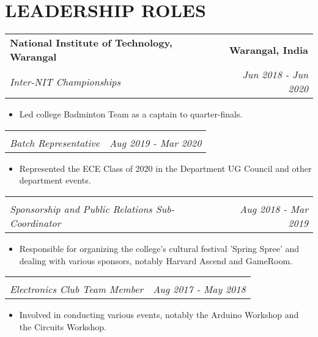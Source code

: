 \documentclass[letterpaper,11pt]{article}
\makeatletter
\newcommand{\resumeItem}[1]{
  \item\small{
    {#1 \vspace{-2pt}}
  }
}
\newcommand{\resumeSubheading}[4]{
  \vspace{-2pt}\item
    \begin{tabular*}{1.0\textwidth}[t]{l@{\extracolsep{\fill}}r}
      \textbf{#1} & \textbf{\small #2} \\
      \textit{\small#3} & \textit{\small #4} \\
    \end{tabular*}\vspace{-7pt}
}
\newcommand{\resumeItemListStart}{\begin{itemize}}
\newcommand{\resumeItemListEnd}{\end{itemize}\vspace{-5pt}}
\makeatother
\begin{document}
  
\section{LEADERSHIP ROLES}
 \resumeSubheading 
      {National Institute of Technology, Warangal}{Warangal, India}      
      {Inter-NIT Championships}{Jun 2018 - Jun 2020}
      \resumeItemListStart     
        	\resumeItem{Led college Badminton Team as a captain to quarter-finals.}
      \resumeItemListEnd  
      
 \vspace{-15pt}
 \resumeSubheading 
      {}{}      
      {Batch Representative}{Aug 2019 - Mar 2020}
      \resumeItemListStart      
        	\resumeItem{Represented the ECE Class of 2020 in the Department UG 												Council and other department events.}
        	\resumeItemListEnd
            
   \vspace{-15pt}
  \resumeSubheading 
      {}{}      
      {Sponsorship and Public Relations Sub-Coordinator}{Aug 2018 - Mar 2019}
      \resumeItemListStart      
            \resumeItem{Responsible for organizing the college's cultural festival 'Spring                                     Spree' and dealing with various sponsors, notably Harvard                                              Ascend and GameRoom.}
            \resumeItemListEnd
            
 \vspace{-15pt}
 \resumeSubheading 
      {}{}      
      {Electronics Club Team Member}{Aug 2017 - May 2018}
      \resumeItemListStart      
        	\resumeItem{Involved in conducting various events, notably the Arduino                                             Workshop and the Circuits Workshop.}
      \resumeItemListEnd
      
\end{document}
